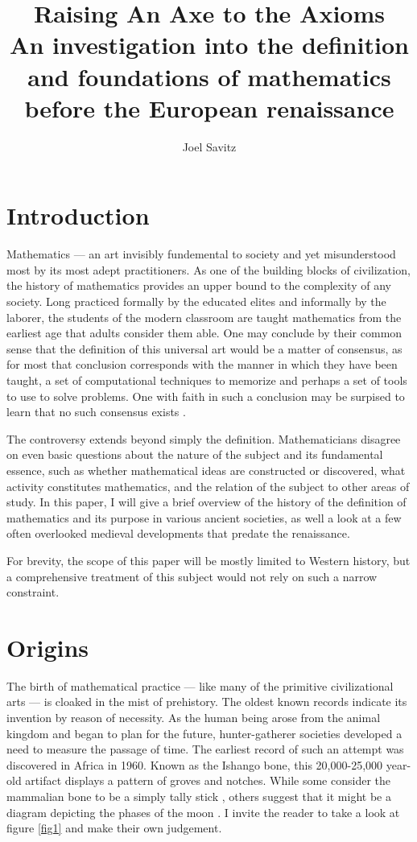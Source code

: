 \documentclass[12pt]{article}
\title{Raising An Axe to the Axioms \\ \small An investigation into the definition and foundations of mathematics before the European renaissance}
\author{Joel Savitz}
\begin{document}
\maketitle


\section{Introduction}

Mathematics ---
an art invisibly fundemental to society
and yet misunderstood most by its most adept practitioners.
As one of the building blocks of civilization,
the history of mathematics provides an upper bound
to the complexity of any society.
Long practiced formally by the educated elites
and informally by the laborer,
the students of the modern classroom
are taught mathematics from the earliest age
that adults consider them able.
One may conclude by their common sense
that the definition of this universal art
would be a matter of consensus,
as for most that conclusion corresponds
with the manner in which they have been taught,
a set of computational techniques to memorize and
perhaps a set of tools to use to solve problems.
One with faith in such a conclusion
may be surpised to learn that
no such consensus exists \cite{tobies}.

The controversy extends
beyond simply the definition.
Mathematicians disagree on even
basic questions
about the nature of the subject
and its fundamental essence,
such as whether mathematical ideas
are constructed or discovered,
what activity constitutes mathematics,
and the relation of the subject
to other areas of study.
In this paper,
I will give a brief overview
of the history of the definition of mathematics
and its purpose in various ancient societies,
as well a look at a few often overlooked
medieval developments that predate the renaissance.

For brevity, the scope of this paper
will be mostly limited
to Western history,
but a comprehensive treatment of this subject
would not rely on such a narrow constraint.

\section{Origins}

The birth of mathematical practice
--- like many of the primitive civilizational arts ---
is cloaked in the mist of prehistory.
The oldest known records indicate its
invention by reason of necessity.
As the human being arose from the animal kingdom
and began to plan for the future,
hunter-gatherer societies developed
a need to measure the passage of time.
The earliest record of such an attempt
was discovered in Africa in 1960.
Known as the Ishango bone,
this 20,000-25,000 year-old artifact
displays a pattern of groves and notches.
While some consider the mammalian bone
to be a simply tally stick \cite{ishango},
others suggest that it might be a diagram
depicting the phases of the moon \cite{ishango2}.
I invite the reader to take a look at figure \ref{fig1}
and make their own judgement.
\end{document}
